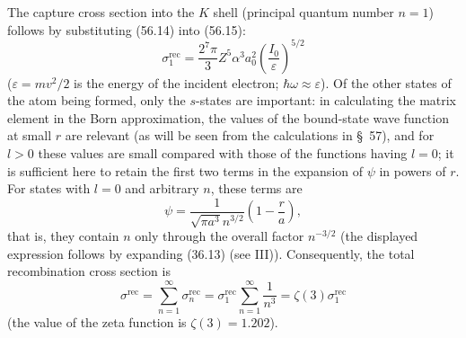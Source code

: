 \SolutionHeading The capture cross section into the $K$ shell (principal quantum number $n=1$) follows by substituting (56.14) into (56.15):
\[
\sigma_1^{\text{rec}}
=\frac{2^7\pi}{3}Z^5\alpha^3a_0^2
\left(\frac{I_0}{\varepsilon}\right)^{\!5/2}
\]
($\varepsilon=mv^2/2$ is the energy of the incident electron; $\hbar\omega\approx\varepsilon$). Of the other states of the atom being formed, only the $s$-states are important: in calculating the matrix element in the Born approximation, the values of the bound-state wave function at small $r$ are relevant (as will be seen from the calculations in \S~57), and for $l>0$ these values are small compared with those of the functions having $l=0$; it is sufficient here to retain the first two terms in the expansion of $\psi$ in powers of $r$. For states with $l=0$ and arbitrary $n$, these terms are
\[
\psi=\frac1{\sqrt{\pi a^3}n^{3/2}}
\left(1-\frac ra\right),
\]
that is, they contain $n$ only through the overall factor $n^{-3/2}$ (the displayed expression follows by expanding (36.13) (see III)). Consequently, the total recombination cross section is
\[
\sigma^{\text{rec}}
=\sum_{n=1}^{\infty}\sigma_n^{\text{rec}}
=\sigma_1^{\text{rec}}\sum_{n=1}^{\infty}\frac1{n^3}
=\zeta(3)\sigma_1^{\text{rec}}
\]
(the value of the zeta function is $\zeta(3)=1{.}202$).
